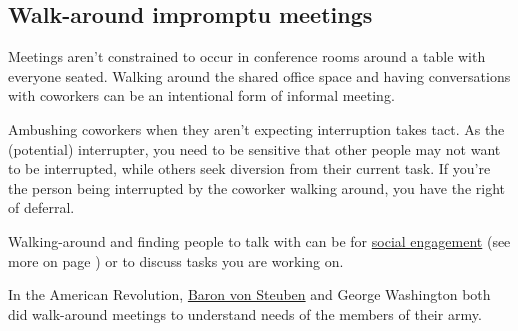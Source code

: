 \subsection*{Walk-around impromptu meetings\label{sec:walk-arounds}}

Meetings aren't constrained to occur in conference rooms around a table with everyone seated. Walking around the shared office space and having conversations with coworkers can be an intentional form of informal meeting. 

Ambushing coworkers when they aren't expecting interruption takes tact. As the (potential) interrupter, you need to be sensitive that other people may not want to be interrupted, while others seek diversion from their current task. If you're the person being interrupted by the coworker walking around, you have the right of deferral. 

Walking-around and finding people to talk with can be for \hyperref[sec:socializing]{social engagement} (see more on page \pageref{sec:socializing}) or to discuss tasks you are working on. 





In the American Revolution, \href{https://en.wikipedia.org/wiki/Friedrich_Wilhelm_von_Steuben}{Baron von Steuben} and George Washington both did walk-around meetings to understand needs of the members of their army. 